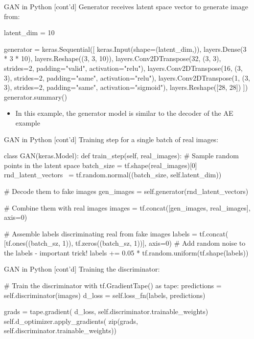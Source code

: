\documentclass[ignorenonframetext,xcolor=x11names]{beamer}
\begin{document}
\begin{frame}[label=withcode,fragile]{GAN in Python \small [cont'd]}
Generator receives latent space vector to generate image from:

\begin{pythoncode}
latent_dim = 10

generator = keras.Sequential([
    keras.Input(shape=(latent_dim,)),
    layers.Dense(3 * 3 * 10),
    layers.Reshape((3, 3, 10)),
    layers.Conv2DTranspose(32, (3, 3), strides=2, 
        padding="valid", activation="relu"),
    layers.Conv2DTranspose(16, (3, 3), strides=2, 
        padding="same", activation="relu"),
    layers.Conv2DTranspose(1, (3, 3), strides=2, 
        padding="same", activation="sigmoid"),
    layers.Reshape([28, 28])
])
generator.summary()
\end{pythoncode}
\begin{itemize}
   \item In this example, the generator model is similar to the decoder of the AE example
\end{itemize}
\end{frame}

\begin{frame}[label=withcode,fragile]{GAN in Python \small [cont'd]}
Training step for a single batch of real images:
\begin{pythoncode}
class GAN(keras.Model):
    def train_step(self, real_images):
        # Sample random points in the latent space
        batch_size = tf.shape(real_images)[0]
        rnd_latent_vectors \
            = tf.random.normal((batch_size, self.latent_dim))

        # Decode them to fake images
        gen_images = self.generator(rnd_latent_vectors)

        # Combine them with real images
        images = tf.concat([gen_images, real_images], axis=0)

        # Assemble labels discriminating real from fake images
        labels = tf.concat(
            [tf.ones((batch_sz, 1)), 
            tf.zeros((batch_sz, 1))], axis=0)
        # Add random noise to the labels - important trick!
        labels += 0.05 * tf.random.uniform(tf.shape(labels))
\end{pythoncode}
\end{frame}

\begin{frame}[label=withcode,fragile]{GAN in Python \small [cont'd]}
Training the discriminator:
\begin{pythoncode}
        # Train the discriminator
        with tf.GradientTape() as tape:
            predictions = self.discriminator(images)
            d_loss = self.loss_fn(labels, predictions)
            
        grads = tape.gradient(
            d_loss, 
            self.discriminator.trainable_weights)
        self.d_optimizer.apply_gradients(
            zip(grads, self.discriminator.trainable_weights))
\end{pythoncode}
\end{frame}
\end{document}
